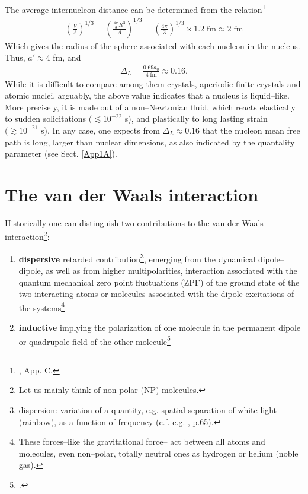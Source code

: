 \begin{subappendices}
The average internucleon distance can be determined from the relation\footnote{\cite{Brink:05}, App. C.}
\begin{align}
\left(\frac{V}{A}\right)^{1/3}=\left(\frac{\frac{4\pi}{3}R^3}{A}\right)^{1/3}=\left(\frac{4\pi}{3}\right)^{1/3}\times 1.2\; \text{fm}\approx 2\;\text{fm}
\end{align} 
Which gives the radius of the sphere associated with each nucleon in the nucleus. Thus, $a'\approx4$ fm, and 
\begin{align}
\Delta_L=\frac{0.69 a_0}{4\;\text{fm}}\approx0.16.
\end{align} 
While it is difficult to compare among them crystals, aperiodic finite crystals and atomic nuclei, arguably, the above value indicates that a nucleus is liquid--like. More precisely, it is made out of a non--Newtonian fluid, which reacts elastically to sudden so\-li\-ci\-ta\-tions $(\lesssim 10^{-22}$ s),  and plastically to long lasting strain $(\gtrsim 10^{-21}$ s). In any case, one expects from $\Delta_L\approx 0.16$ that the nucleon mean free path is long, larger than nuclear dimensions, as also indicated by the quantality parameter (see Sect. \ref{App1A}). 

\section{The van der Waals interaction}\label{C2AppD}
Historically one can distinguish two contributions to the van der Waals interaction\footnote{Let us mainly think of non polar (NP) molecules.}: 
\begin{enumerate}
\item \textbf{dispersive} retarded contribution\footnote{dispersion: variation of a quantity, e.g. spatial separation of white light (rainbow), as a function of frequency (c.f. e.g. \cite{Israelachvili:85}, p.65).}, emerging from the dynamical dipole--dipole, as well as from higher multipolarities, interaction associated with the quantum mechanical zero point fluctuations (ZPF) of the ground state of the two interacting atoms or molecules associated with the dipole excitations of the systems\footnote{These forces--like the gravitational force-- act between all atoms and molecules, even non--polar, totally neutral ones as hydrogen or helium (noble gas).} 
\item \textbf{inductive} implying the polarization of one molecule in the permanent dipole or quadrupole field of the other molecule\footnote{\cite{Debye:20,Debye:21}.} 
\end{enumerate}


\end{subappendices}
